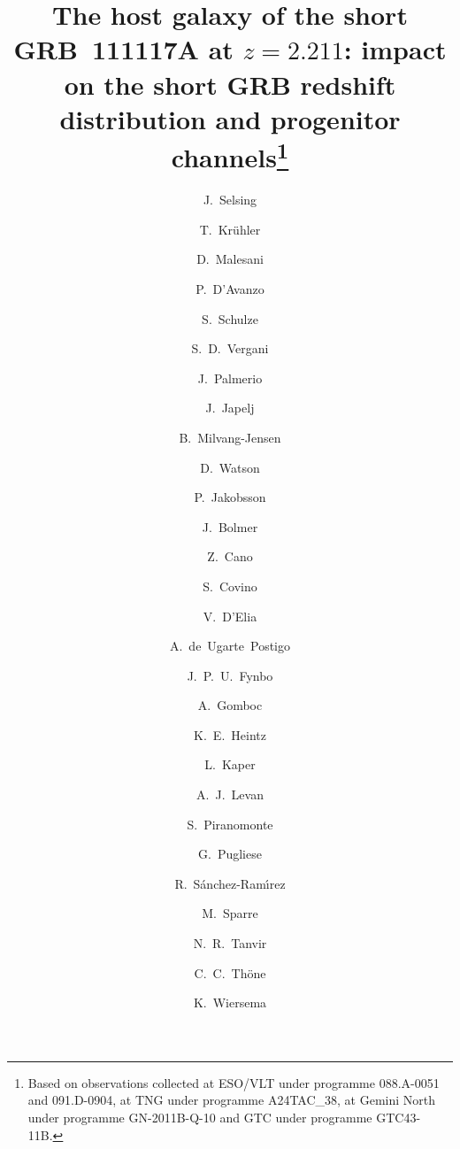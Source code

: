 \documentclass[referee]{aa}
\begin{document}
	
\title{The host galaxy of the short GRB~111117A at $z = 2.211$: impact on the short GRB redshift distribution and progenitor channels\thanks{Based on observations collected at ESO/VLT under programme 088.A-0051 and 091.D-0904, at TNG under programme A24TAC\_38, at Gemini North under programme GN-2011B-Q-10 and GTC under programme GTC43-11B.}}



\author{J.~Selsing
	\and T.~Kr\"{u}hler
	\and D.~Malesani
	\and P.~D'Avanzo
	\and S.~Schulze 
	\and S.~D.~Vergani
	\and J.~Palmerio
	\and J.~Japelj
	\and B.~Milvang-Jensen
	\and D.~Watson
	\and P.~Jakobsson
	\and J.~Bolmer 
	\and Z.~Cano
	\and S.~Covino 
	\and V.~D'Elia
	\and A.~de~Ugarte~Postigo
	\and J.~P.~U.~Fynbo
	\and A.~Gomboc
	\and K.~E.~Heintz
	\and L.~Kaper 
	\and A.~J.~Levan 
	\and S.~Piranomonte 
	\and G.~Pugliese 
	\and R.~S\'{a}nchez-Ram\'{\i}rez 
	\and M.~Sparre
	\and N.~R.~Tanvir
	\and C.~C.~Th\"{o}ne
	\and K.~Wiersema 
}
\end{document}
